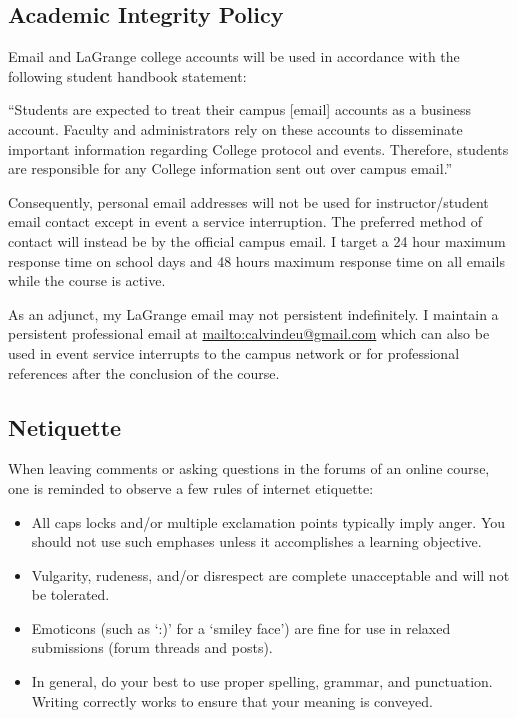 \documentclass[11pt]{article}
\begin{document}
\subsection*{Academic Integrity Policy}

Email and LaGrange college accounts will be used in accordance with the following student handbook
statement:

\begin{displayquote}
“Students are expected to treat their campus [e­mail] accounts as a business account.
Faculty and administrators rely on these accounts to disseminate important information regarding
College protocol and events. Therefore, students are responsible for any College information sent
out over campus e­mail.”
\end{displayquote}

Consequently, personal email addresses will not be used for instructor/student email contact except in event a service interruption. The preferred
method of contact will instead be by the official campus email. I target a 24 hour maximum response time on school days and 48 hours maximum response time on all emails while the course is active.

As an adjunct, my LaGrange email may not persistent indefinitely. I maintain a persistent professional email at \href{calvindeu@gmail.com}{mailto:calvindeu@gmail.com} which can also be used in event service interrupts to the campus network or for professional references after the conclusion of the course.

\subsection*{Netiquette}

When leaving comments or asking questions in the forums of an online course, one is reminded to observe
a few rules of internet etiquette:

\begin{itemize}
\item All caps locks and/or multiple exclamation points typically imply anger. You should not use such
emphases unless it accomplishes a learning objective.
\item Vulgarity, rudeness, and/or disrespect are complete unacceptable and will not be tolerated.
\item Emoticons (such as ‘:)’ for a ‘smiley face’) are fine for use in relaxed submissions (forum threads
and posts).
\item In general, do your best to use proper spelling, grammar, and punctuation. Writing correctly
works to ensure that your meaning is conveyed.
\end{itemize}
\end{document}
